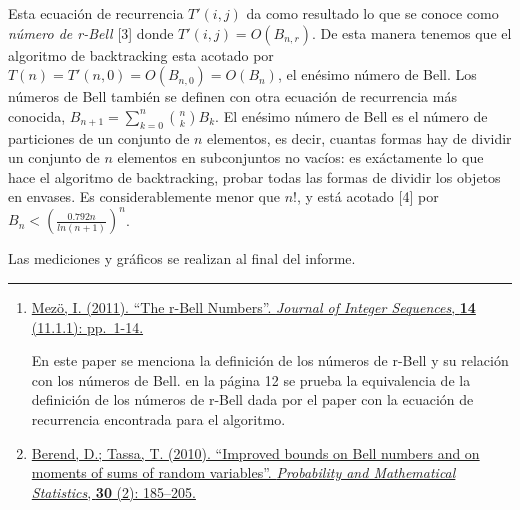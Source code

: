 \documentclass[11pt]{article}
\begin{document}
Esta ecuación de recurrencia \(T'(i, j)\) da como resultado lo que se
conoce como \emph{número de r-Bell} {[}3{]} donde
\(T'(i, j)=O(B_{n, r})\). De esta manera tenemos que el algoritmo de
backtracking esta acotado por
\(T(n) = T'(n, 0) = O(B_{n, 0}) = O(B_n)\), el enésimo número de Bell.
Los números de Bell también se definen con otra ecuación de recurrencia
más conocida, \(B_{n+1} = \sum\limits_{k=0}^n \binom{n}{k} B_k\). El
enésimo número de Bell es el número de particiones de un conjunto de
\(n\) elementos, es decir, cuantas formas hay de dividir un conjunto de
\(n\) elementos en subconjuntos no vacíos: es exáctamente lo que hace el
algoritmo de backtracking, probar todas las formas de dividir los
objetos en envases. Es considerablemente menor que \(n!\), y está
acotado {[}4{]} por \(B_n < \left(\frac{0.792n}{ln(n+1)}\right)^n\).

Las mediciones y gráficos se realizan al final del informe.

\begin{center}\rule{0.5\linewidth}{0.5pt}\end{center}

\begin{enumerate}
\def\labelenumi{\arabic{enumi}.}
\setcounter{enumi}{2}
\item
  \href{https://cs.uwaterloo.ca/journals/JIS/VOL14/Mezo/mezo9.pdf}{Mezö,
  I. (2011). ``The r-Bell Numbers''. \emph{Journal of Integer
  Sequences}, \textbf{14} (11.1.1): pp.~1-14.}

  En este paper se menciona la definición de los números de r-Bell y su
  relación con los números de Bell. en la página 12 se prueba la
  equivalencia de la definición de los números de r-Bell dada por el
  paper con la ecuación de recurrencia encontrada para el algoritmo.
\item
  \href{https://www.openu.ac.il/lists/mediaserver_documents/personalsites/tamirtassa/lp_moments.pdf}{Berend,
  D.; Tassa, T. (2010). ``Improved bounds on Bell numbers and on moments
  of sums of random variables''. \emph{Probability and Mathematical
  Statistics}, \textbf{30} (2): 185--205.}
\end{enumerate}
\end{document}
